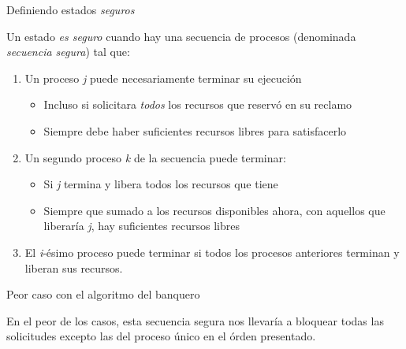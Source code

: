 \documentclass[presentation]{beamer}
\begin{document}
\begin{frame}[label={sec:orgbd14eef}]{Definiendo estados \emph{seguros}}
\begin{center}
Un estado \emph{es seguro} cuando hay una secuencia de procesos (denominada
\emph{secuencia segura}) tal que:
\end{center}
\begin{enumerate}
\item Un proceso \emph{j} puede necesariamente terminar su ejecución
\begin{itemize}
\item Incluso si solicitara \emph{todos} los recursos que reservó en su
reclamo
\item Siempre debe haber suficientes recursos libres para satisfacerlo
\end{itemize}

\item Un segundo proceso \emph{k} de la secuencia puede terminar:
\begin{itemize}
\item Si \emph{j} termina y libera todos los recursos que tiene
\item Siempre que sumado a los recursos disponibles ahora, con aquellos
que liberaría \emph{j}, hay suficientes recursos libres
\end{itemize}

\item El \emph{i}-ésimo proceso puede terminar si todos los procesos
anteriores terminan y liberan sus recursos.
\end{enumerate}
\end{frame}

\begin{frame}[label={sec:orga9f0e62}]{Peor caso con el algoritmo del banquero}
\begin{center}
En el peor de los casos, esta secuencia segura nos llevaría a bloquear
todas las solicitudes excepto las del proceso único en el órden
presentado.
\end{center}
\end{frame}
\end{document}
